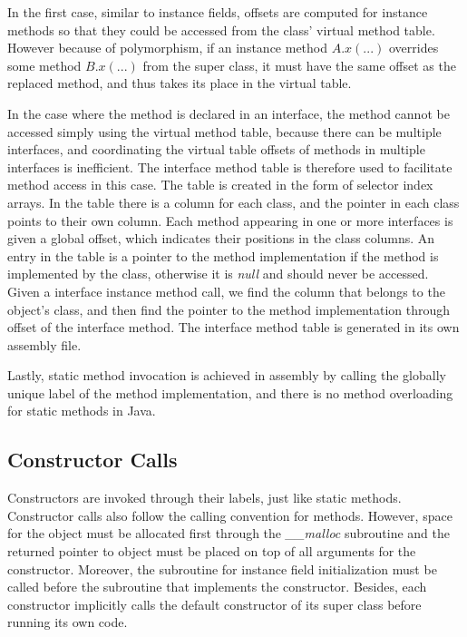 \documentclass[a4paper, notitlepage]{report}
\begin{document}
In the first case, similar to instance fields, offsets are computed for instance methods so that they could be accessed from the class' virtual method table. However because of polymorphism, if an instance method $A.x(...)$ overrides some method $B.x(...)$ from the super class, it must have the same offset as the replaced method, and thus takes its place in the virtual table. 

In the case where the method is declared in an interface, the method cannot be accessed simply using the virtual method table, because there can be multiple interfaces, and coordinating the virtual table offsets of methods in multiple interfaces is inefficient. The interface method table is therefore used to facilitate method access in this case. The table is created in the form of selector index arrays. In the table there is a column for each class, and the pointer in each class points to their own column. Each method appearing in one or more interfaces is given a global offset, which indicates their positions in the class columns. An entry in the table is a pointer to the method implementation if the method is implemented by the class, otherwise it is \emph{null} and should never be accessed. Given a interface instance method call, we find the column that belongs to the object's class, and then find the pointer to the method implementation through offset of the interface method. The interface method table is generated in its own assembly file.

Lastly, static method invocation is achieved in assembly by calling the globally unique label of the method implementation, and there is no method overloading for static methods in Java.

\subsection{Constructor Calls}
\label{constructor_call}

Constructors are invoked through their labels, just like static methods. Constructor calls also follow the calling convention for methods. However, space for the object must be allocated first through the \emph{\_\_malloc} subroutine and the returned pointer to object must be placed on top of all arguments for the constructor. Moreover, the subroutine for instance field initialization must be called before the subroutine that implements the constructor. Besides, each constructor implicitly calls the default constructor of its super class before running its own code. 
\end{document}
